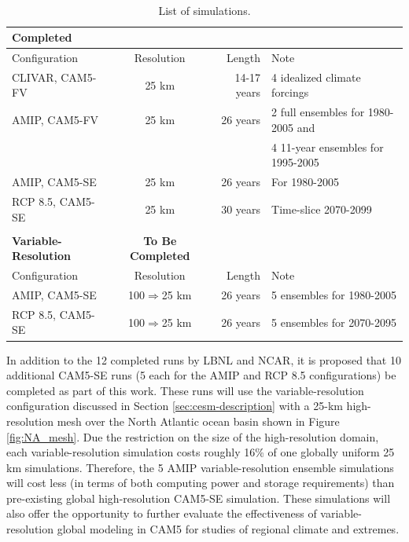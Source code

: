 \documentclass[11pt]{article}
\begin{document}
\begin{table} 
\begin{center}
\caption{List of simulations.\label{t:runs} }
\ \\
\begin{tabular}{l c r l}
\textbf{Completed} \\
\hline
Configuration & Resolution & Length & Note \\ 
\hline
CLIVAR, CAM5-FV & 25 km & 14-17 years & 4 idealized climate forcings  \\
AMIP, CAM5-FV & 25 km & 26 years    & 2 full ensembles for 1980-2005 and  \\
& & & 4 11-year ensembles for 1995-2005 \\
AMIP, CAM5-SE & 25 km & 26 years    &  For 1980-2005 \\
RCP 8.5, CAM5-SE & 25 km & 30 years    & Time-slice 2070-2099 \\
\hline
\\
\textbf{Variable-Resolution} & \textbf{To Be Completed} & & \\
\hline
Configuration & Resolution & Length & Note \\ 
\hline
AMIP, CAM5-SE & 100$\Rightarrow$25 km & 26 years    & 5 ensembles for 1980-2005 \\
RCP 8.5, CAM5-SE & 100$\Rightarrow$25 km & 26 years    & 5 ensembles for 2070-2095 \\
\hline
\end{tabular}
\end{center}
\end{table}

In addition to the 12 completed runs by LBNL and NCAR, it is proposed that 10 additional CAM5-SE runs (5 each for the AMIP and RCP 8.5 configurations) be completed as part of this work.  These runs will use the variable-resolution configuration discussed in Section \ref{sec:cesm-description} with a 25-km high-resolution mesh over the North Atlantic ocean basin shown in Figure \ref{fig:NA_mesh}. Due the restriction on the size of the high-resolution domain, each variable-resolution simulation costs roughly 16\% of one globally uniform 25 km simulations.  Therefore, the 5 AMIP variable-resolution ensemble simulations will cost less (in terms of both computing power and storage requirements) than pre-existing global high-resolution CAM5-SE simulation. These simulations will also offer the opportunity to further evaluate the effectiveness of variable-resolution global modeling in CAM5 for studies of regional climate and extremes. 
\end{document}
